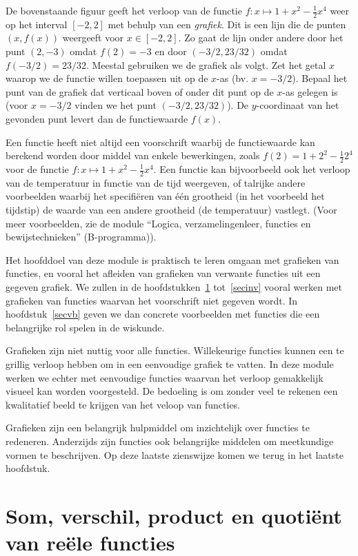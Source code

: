 \documentclass{ximera}
\begin{document}
De bovenstaande figuur geeft het verloop van de functie $f:x\mapsto
1+x^2-\frac{1}{2}x^4$ weer op het interval $[-2,2]$ met behulp van een
{\em grafiek}. Dit is een lijn die de punten $(x,f(x))$ weergeeft voor
$x\in[-2,2]$. Zo gaat de lijn onder andere door het punt $(2,-3)$
omdat $f(2)=-3$ en door $(-3/2,23/32)$ omdat $f(-3/2)=23/32$. Meestal
gebruiken we de grafiek als volgt. Zet het getal $x$ waarop we de
functie willen toepassen uit op de $x$-as (bv. $x=-3/2$). Bepaal het
punt van de grafiek dat verticaal boven of onder dit punt op de $x$-as
gelegen is (voor $x=-3/2$ vinden we het punt $(-3/2,23/32)$). De
$y$-coordinaat van het gevonden punt levert dan de functiewaarde
$f(x)$.

Een functie heeft niet altijd een voorschrift waarbij de functiewaarde
kan berekend worden door middel van enkele bewerkingen, zoals
$f(2)=1+2^2-\frac{1}{2}2^4$ voor de functie $f:x\mapsto
1+x^2-\frac{1}{2}x^4$. Een functie kan bijvoorbeeld ook het verloop
van de temperatuur in functie van de tijd weergeven, of talrijke
andere voorbeelden waarbij het specifi\"eren van \'e\'en grootheid (in
het voorbeeld het tijdstip) de waarde van een andere grootheid (de
temperatuur) vastlegt. (Voor meer voorbeelden, zie de module ``Logica,
verzamelingenleer, functies en bewijstechnieken'' (B-programma)).

Het hoofddoel van deze module is praktisch te leren omgaan met
grafieken van functies, en vooral het afleiden van grafieken van
verwante functies uit een gegeven grafiek. We zullen in
de hoofdstukken~\ref{secsom} tot~\ref{secinv} vooral werken met
grafieken van functies waarvan het voorschrift niet gegeven
wordt. In hoofdstuk~\ref{secvb} geven we dan concrete voorbeelden
met functies die een belangrijke rol spelen in de wiskunde.

Grafieken zijn niet nuttig voor alle functies. Willekeurige functies
kunnen een te grillig verloop hebben om in een eenvoudige grafiek te
vatten. In deze module werken we echter met eenvoudige functies
waarvan het verloop gemakkelijk visueel kan worden voorgesteld.
De bedoeling is om zonder veel te rekenen een kwalitatief beeld te
krijgen van het veloop van functies.

Grafieken zijn een belangrijk hulpmiddel om inzichtelijk over functies
te redeneren. Anderzijds zijn functies ook belangrijke middelen om
meetkundige vormen te beschrijven. Op deze laatste zienswijze komen we 
terug in het laatste hoofdstuk.


\section{Som, verschil, product en quoti\"ent van re\"ele functies}
\label{secsom}
\end{document}
